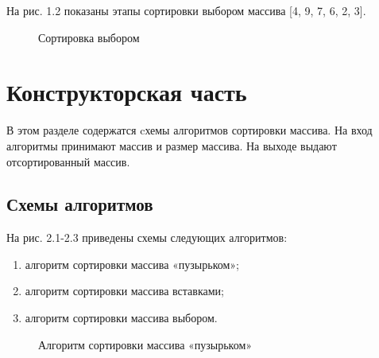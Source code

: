 \documentclass[12pt]{report}
\begin{document}
На рис. 1.2 показаны этапы сортировки выбором массива [4, 9, 7,
6, 2, 3].

\begin{figure}[h]
	\caption{Сортировка выбором}
	\label{figure:image}
\end{figure}

\chapter{Конструкторская часть}
В этом разделе содержатся cхемы алгоритмов сортировки массива.
На вход алгоритмы принимают массив и размер массива. На выходе выдают отсортированный массив.\vspace{\baselineskip}
	
\section{Схемы алгоритмов}
На рис. 2.1-2.3 приведены схемы следующих алгоритмов:
\begin{enumerate}
	\item алгоритм сортировки массива «пузырьком»;
	\item алгоритм сортировки массива вставками;
	\item алгоритм сортировки массива выбором.
\end{enumerate}

\newpage
\begin{figure}[h]
	\caption{Алгоритм сортировки массива «пузырьком»}
	\label{figure:image}
\end{figure}
\end{document}

